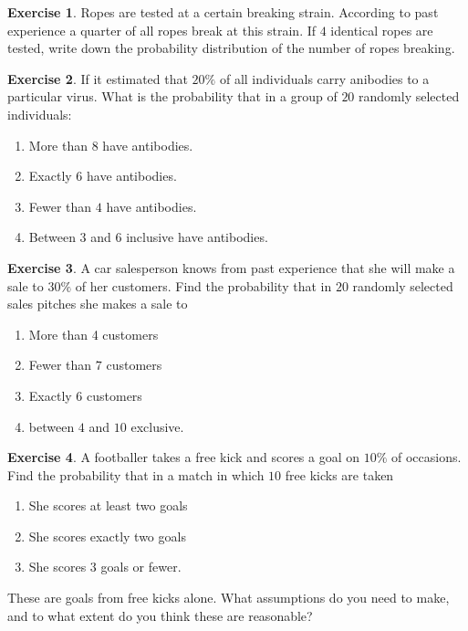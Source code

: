 \documentclass[
]{book}
\theoremstyle{definition}
\theoremstyle{definition}
\theoremstyle{definition}
\newtheorem{exercise}{Exercise}[chapter]
\theoremstyle{definition}
\theoremstyle{remark}
\begin{document}
\begin{exercise}
Ropes are tested at a certain breaking strain. According to past experience a quarter of all ropes break at this strain. If \(4\) identical ropes are tested, write down the probability distribution of the number of ropes breaking.
\end{exercise}

\begin{exercise}

If it estimated that \(20\%\) of all individuals carry anibodies to a particular virus. What is the probability that in a group of \(20\) randomly selected individuals:

\begin{enumerate}
\def\labelenumi{\alph{enumi})}
\item
  More than \(8\) have antibodies.
\item
  Exactly \(6\) have antibodies.
\item
  Fewer than \(4\) have antibodies.
\item
  Between \(3\) and \(6\) inclusive have antibodies.
\end{enumerate}

\end{exercise}

\begin{exercise}

A car salesperson knows from past experience that she will make a sale to \(30\%\) of her customers. Find the probability that in \(20\) randomly selected sales pitches she makes a sale to

\begin{enumerate}
\def\labelenumi{\alph{enumi})}
\item
  More than 4 customers
\item
  Fewer than \(7\) customers
\item
  Exactly \(6\) customers
\item
  between \(4\) and \(10\) exclusive.
\end{enumerate}

\end{exercise}

\begin{exercise}
A footballer takes a free kick and scores a goal on \(10\%\) of occasions. Find the probability that in a match in which \(10\) free kicks are taken

\begin{enumerate}
\def\labelenumi{\alph{enumi})}
\item
  She scores at least two goals
\item
  She scores exactly two goals
\item
  She scores \(3\) goals or fewer.
\end{enumerate}

These are goals from free kicks alone. What assumptions do you need to make, and to what extent do you think these are reasonable?
\end{exercise}
\end{document}
